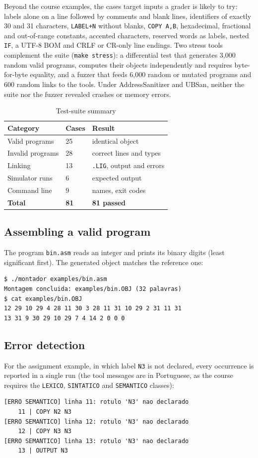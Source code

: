 \documentclass[conference]{IEEEtran}
\begin{document}
Beyond the course examples, the cases target inputs a grader is likely to try: labels alone on a line followed by comments and blank lines, identifiers of exactly 30 and 31 characters, \texttt{LABEL+N} without blanks, \texttt{COPY A,B}, hexadecimal, fractional and out-of-range constants, accented characters, reserved words as labels, nested \texttt{IF}, a UTF-8 BOM and CRLF or CR-only line endings. Two stress tools complement the suite (\texttt{make stress}): a differential test that generates 3,000 random valid programs, computes their objects independently and requires byte-for-byte equality, and a fuzzer that feeds 6,000 random or mutated programs and 600 random links to the tools. Under AddressSanitizer and UBSan, neither the suite nor the fuzzer revealed crashes or memory errors.

\begin{table}[!htbp]
\centering
\caption{Test-suite summary}\label{tab:tests}
\begin{tabular}{p{2.6cm} p{0.9cm} p{3.2cm}}
\toprule
\textbf{Category} & \textbf{Cases} & \textbf{Result}\\
\midrule
Valid programs & 25 & identical object\\
Invalid programs & 28 & correct lines and types\\
Linking & 13 & \texttt{.LIG}, output and errors\\
Simulator runs & 6 & expected output\\
Command line & 9 & names, exit codes\\
\midrule
\textbf{Total} & \textbf{81} & \textbf{81 passed}\\
\bottomrule
\end{tabular}
\end{table}

\subsection{Assembling a valid program}
The program \texttt{bin.asm} reads an integer and prints its binary digits (least significant first). The generated object matches the reference one:
\begin{lstlisting}
$ ./montador examples/bin.asm
Montagem concluida: examples/bin.OBJ (32 palavras)
$ cat examples/bin.OBJ
12 29 10 29 4 28 11 30 3 28 11 31 10 29 2 31 11 31
13 31 9 30 29 10 29 7 4 14 2 0 0 0
\end{lstlisting}

\subsection{Error detection}
For the assignment example, in which label \texttt{N3} is not declared, every occurrence is reported in a single run (the tool messages are in Portuguese, as the course requires the \texttt{LEXICO}, \texttt{SINTATICO} and \texttt{SEMANTICO} classes):
\begin{lstlisting}
[ERRO SEMANTICO] linha 11: rotulo 'N3' nao declarado
    11 | COPY N2 N3
[ERRO SEMANTICO] linha 12: rotulo 'N3' nao declarado
    12 | COPY N3 N3
[ERRO SEMANTICO] linha 13: rotulo 'N3' nao declarado
    13 | OUTPUT N3
\end{lstlisting}
\end{document}
